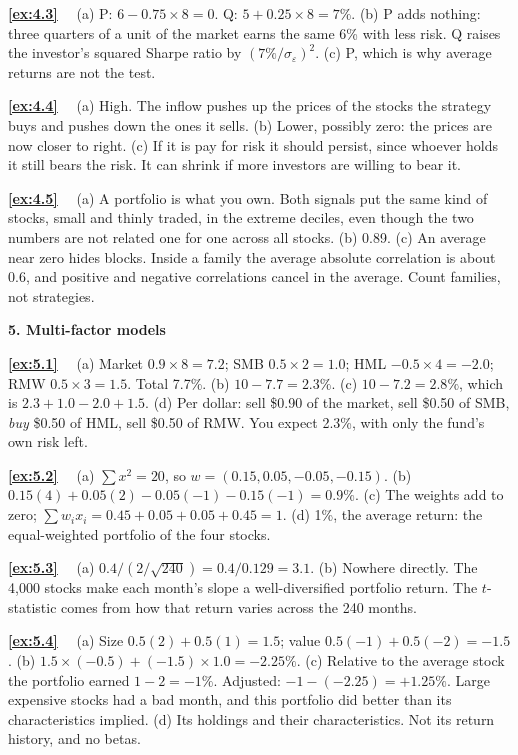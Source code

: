 \documentclass[11pt]{article}
\newcounter{ex}[section]
\newcommand{\sol}[1]{\par\smallskip\textbf{\ref{#1}}\ \ }
\newcommand{\head}[1]{\par\medskip\textbf{#1}\par}
\begin{document}
{\sol{ex:4.3} (a) P: $6 - 0.75\times 8 = 0$. Q: $5 + 0.25\times 8 = 7\%$. (b) P adds nothing: three quarters of a unit of
the market earns the same 6\% with less risk. Q raises the investor's squared Sharpe ratio by $(7\%/\sigma_{\varepsilon})^{2}$.
(c) P, which is why average returns are not the test.

\sol{ex:4.4} (a) High. The inflow pushes up the prices of the stocks the strategy buys and pushes down the ones it
sells. (b) Lower, possibly zero: the prices are now closer to right. (c) If it is pay for risk it should persist, since
whoever holds it still bears the risk. It can shrink if more investors are willing to bear it.

\sol{ex:4.5} (a) A portfolio is what you own. Both signals put the same kind of stocks, small and thinly traded, in the
extreme deciles, even though the two numbers are not related one for one across all stocks. (b) 0.89. (c) An average
near zero hides blocks. Inside a family the average absolute correlation is about 0.6, and positive and negative
correlations cancel in the average. Count families, not strategies.

\head{5. Multi-factor models}

\sol{ex:5.1} (a) Market $0.9\times 8 = 7.2$; SMB $0.5\times 2 = 1.0$; HML $-0.5\times 4 = -2.0$; RMW $0.5\times 3 = 1.5$.
Total 7.7\%. (b) $10 - 7.7 = 2.3\%$. (c) $10 - 7.2 = 2.8\%$, which is $2.3 + 1.0 - 2.0 + 1.5$. (d) Per dollar: sell \$0.90
of the market, sell \$0.50 of SMB, \emph{buy} \$0.50 of HML, sell \$0.50 of RMW. You expect 2.3\%, with only the fund's
own risk left.

\sol{ex:5.2} (a) $\sum x^{2} = 20$, so $w = (0.15, 0.05, -0.05, -0.15)$. (b) $0.15(4) + 0.05(2) - 0.05(-1) - 0.15(-1) = 0.9\%$.
(c) The weights add to zero; $\sum w_{i}x_{i} = 0.45 + 0.05 + 0.05 + 0.45 = 1$. (d) 1\%, the average return: the
equal-weighted portfolio of the four stocks.

\sol{ex:5.3} (a) $0.4/(2/\sqrt{240}) = 0.4/0.129 = 3.1$. (b) Nowhere directly. The 4{,}000 stocks make each month's slope
a well-diversified portfolio return. The $t$-statistic comes from how that return varies across the 240 months.

\sol{ex:5.4} (a) Size $0.5(2) + 0.5(1) = 1.5$; value $0.5(-1) + 0.5(-2) = -1.5$. (b) $1.5\times(-0.5) + (-1.5)\times 1.0 =
-2.25\%$. (c) Relative to the average stock the portfolio earned $1 - 2 = -1\%$. Adjusted: $-1 - (-2.25) = +1.25\%$. Large
expensive stocks had a bad month, and this portfolio did better than its characteristics implied. (d) Its holdings and
their characteristics. Not its return history, and no betas.

}
\end{document}
